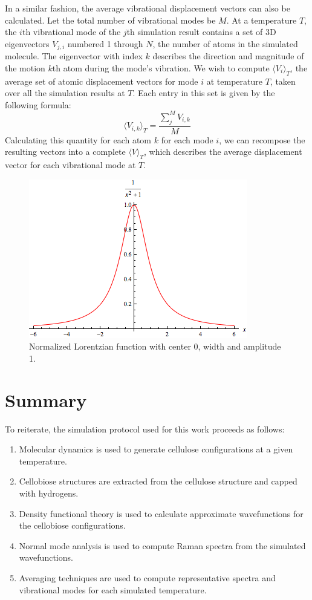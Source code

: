 In a similar fashion, the average vibrational displacement vectors can also be calculated. Let the total number of vibrational modes be $M$. At a temperature $T$, the $i$th vibrational mode of the $j$th simulation result contains a set of 3D eigenvectors $V_{j,i}$ numbered 1 through $N$, the number of atoms in the simulated molecule. The eigenvector with index $k$ describes the direction and magnitude of the motion $k$th atom during the mode's vibration. We wish to compute $\langle V_i \rangle_T$, the average set of atomic displacement vectors for mode $i$ at temperature $T$, taken over all the simulation results at $T$. Each entry in this set is given by the following formula:
\begin{equation}
\langle V_{i,k} \rangle_{T} = \frac{\sum_j^M V_{i,k}}{M}
\end{equation}
Calculating this quantity for each atom $k$ for each mode $i$, we can recompose the resulting vectors into a complete $\langle V \rangle_T$, which describes the average displacement vector for each vibrational mode at $T$.
\begin{figure}
\centering
\includegraphics[width=0.7\linewidth]{Lorentzian}
\caption{Normalized Lorentzian function with center 0, width and amplitude 1.}
\label{fig:Lorentzian}
\end{figure}

\section{Summary}

To reiterate, the simulation protocol used for this work proceeds as follows: 

\begin{enumerate}
	\item Molecular dynamics is used to generate cellulose configurations at a given temperature.
	\item Cellobiose structures are extracted from the cellulose structure and capped with hydrogens.
	\item Density functional theory is used to calculate approximate wavefunctions for the cellobiose configurations.
	\item Normal mode analysis is used to compute Raman spectra from the simulated wavefunctions.
	\item Averaging techniques are used to compute representative spectra and vibrational modes for each simulated temperature.
\end{enumerate}


